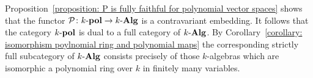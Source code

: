 \begin{remark}
  Proposition~\ref{proposition: P is fully faithful for polynomial vector spaces} shows that the functor $\mathcal{P} \colon k\text{-}\mathbf{pol} \to k\text{-}\mathbf{Alg}$ is a contravariant embedding.
  It follows that the category $k\text{-}\mathbf{pol}$ is dual to a full category of $k\text{-}\mathbf{Alg}$.
  By Corollary~\ref{corollary: isomorphism poylnomial ring and polynomial maps} the corresponding strictly full subcategory of $k\text{-}\mathbf{Alg}$ consists precisely of those $k$-algebras which are isomorphic a polynomial ring over $k$ in finitely many variables.
\end{remark}





